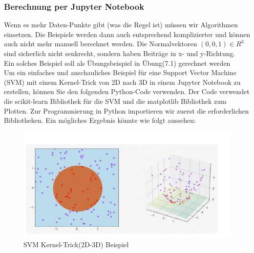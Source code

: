 \documentclass[12pt]{article}
\begin{document}
\subsubsection{Berechnung per Jupyter Notebook}
Wenn es mehr Daten-Punkte gibt (was die Regel ist) müssen wir Algorithmen einsetzen. Die Beispiele werden dann auch entsprechend komplizierter und können auch nicht mehr manuell berechnet werden. Die Normalvektoren $ (0,0,1) \in {R}^3 $ sind sicherlich nicht senkrecht, sondern haben Beiträge in x- und y-Richtung.\\
Ein solches Beispiel soll als Übungsbeispiel in Übung(7.1) gerechnet werden\\[0.3cm]
% 
Um ein einfaches und anschauliches Beispiel für eine Support Vector Machine (SVM) mit einem Kernel-Trick von 2D nach 3D in einem Jupyter Notebook zu erstellen, können Sie den folgenden Python-Code verwenden. Der Code 
verwendet die scikit-learn Bibliothek für die SVM und die matplotlib Bibliothek zum Plotten. Zur Programmierung in Python importieren wir zuerst die erforderlichen Bibliotheken. 
Ein mögliches Ergebnis könnte wie folgt aussehen: \\[0.2cm]
\begin{figure}[htp]
  \centering
  \hspace*{-0.1cm} 
  \includegraphics[width=1.\textwidth]{SVM_Kernel-Trick(2D-3D)_Beispiel}
  \caption{SVM Kernel-Trick(2D-3D) Beispiel}    
  \label{fig:SVM_2D-3D}
\end{figure}
\end{document}
